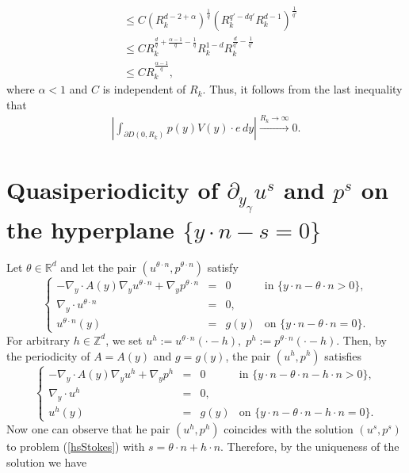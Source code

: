 \documentclass[11pt, reqno]{amsart}
\theoremstyle{definition}
\theoremstyle{remark}
\numberwithin{equation}{section}
\begin{document}
\begin{appendices}
\begin{align*}
			&\leq C \left(    R_k^{d-2+\alpha } \right)^{\frac{1}{q}} \left(  R_k^{q'-dq'} R_k^{d-1} \right)^{\frac{1}{q'}}\\
			&\leq  C R_k^{\frac{d}{q}+\frac{\alpha-1}{q}-\frac{1}{q}}  R_k^{1-d} R_k^{\frac{d}{q'}-\frac{1}{q'}} \\
			&\leq  C R_k^{\frac{\alpha-1}{q}}, 
		\end{align*}
		where $\alpha<1$ and $C$ is independent of $R_k$.
		Thus, it follows from the last inequality that
		\begin{align*}
			\left|	\int_{\partial D(0,R_k)}   p(y) V(y)\cdot e \, dy\right| \xrightarrow{R_k\rightarrow\infty} 0.
		\end{align*}
\section{Quasiperiodicity of $\partial_{y_\gamma} u^s_{}$  and $p^s_{}$ on the hyperplane $\{y\cdot n-s=0\}$}\label{quasiperiod}
\noindent 	Let $\theta\in\mathbb{R}^d$ and let the pair $(u^{\theta\cdot n},p^{\theta\cdot n})$ satisfy
\begin{equation*}
	\left\{
	\begin{array}{rcll}
		-\nabla_{\!y}\cdot A(y)\nabla_{\!y}  u^{\theta\cdot n} +  \nabla_{\!y} p^{\theta\cdot n}&=& 0 & \mbox{in } \{y\cdot n- \theta\cdot n>0 \},\\
		\nabla_{\!y}	\cdot u^{\theta\cdot n}&=& 0 ,    &\\
		u^{\theta\cdot n}(y) &=& g(y)   & \mbox{on }\{y\cdot n- \theta\cdot n =0 \}.
	\end{array}
	\right. 
\end{equation*}
For arbitrary $h\in\mathbb{Z}^d$, we set
$u^h:= u^{\theta\cdot n}(\cdot-h),\; p^h:= p^{\theta\cdot n}(\cdot-h)$. Then, by the periodicity of $A=A(y)$ and $g=g(y)$,    the pair $(u^h,p^h)$ satisfies
\begin{equation*}
	\left\{
	\begin{array}{rcll}
		-\nabla_{\!y}\cdot A(y)\nabla_{\!y} u^h +  \nabla_{\!y} p^h&=& 0& \mbox{in } \{y\cdot n - \theta\cdot n- h\cdot n>0 \},\\
		\nabla_{\!y}	\cdot u^h&=& 0  ,    &\\
		u^h(y) &=& g(y)   & \mbox{on }\{y\cdot n- \theta\cdot n - h\cdot n=0 \}.
	\end{array}
	\right. 
\end{equation*}
Now one can observe that he pair $(u^h,p^h)$ coincides with the solution  $(u^s,p^s)$ to problem (\ref{hsStokes})  with $s=\theta\cdot n+h\cdot n$. Therefore, by the uniqueness of the solution we have 

\end{appendices}
\end{document}
